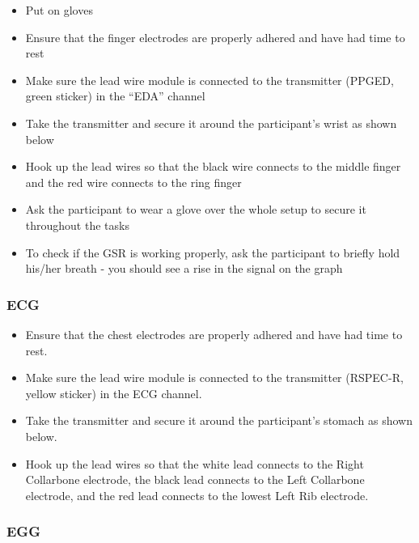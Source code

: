 \documentclass[
]{book}
\providecommand{\tightlist}{%
  \setlength{\itemsep}{0pt}\setlength{\parskip}{0pt}}
\begin{document}
\begin{itemize}
\tightlist
\item
  Put on gloves
\item
  Ensure that the finger electrodes are properly adhered and have had time to rest
\item
  Make sure the lead wire module is connected to the transmitter (PPGED, green sticker) in the ``EDA'' channel
\item
  Take the transmitter and secure it around the participant's wrist as shown below
\item
  Hook up the lead wires so that the black wire connects to the middle finger and the red wire connects to the ring finger
\item
  Ask the participant to wear a glove over the whole setup to secure it throughout the tasks
\item
  To check if the GSR is working properly, ask the participant to briefly hold his/her breath - you should see a rise in the signal on the graph
\end{itemize}

\hypertarget{ecg}{%
\subsubsection{ECG}\label{ecg}}

\begin{itemize}
\tightlist
\item
  Ensure that the chest electrodes are properly adhered and have had time to rest.
\item
  Make sure the lead wire module is connected to the transmitter (RSPEC-R, yellow sticker) in the ECG channel.
\item
  Take the transmitter and secure it around the participant's stomach as shown below.
\item
  Hook up the lead wires so that the white lead connects to the Right Collarbone electrode, the black lead connects to the Left Collarbone electrode, and the red lead connects to the lowest Left Rib electrode.
\end{itemize}

\hypertarget{egg}{%
\subsubsection{EGG}\label{egg}}
\end{document}
